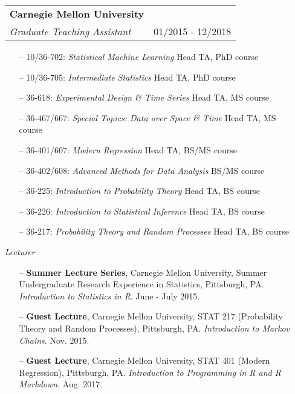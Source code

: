 \documentclass[letterpaper,10pt]{article}
\makeatletter
\newcommand{\subheadingtwo}[4]{
\begin{tabular*}{6.5in}{l@{\cftdotfill{\cftsecdotsep}\extracolsep{\fill}}r}
\textbf{#1} & #2 \\
#3 & {#4} \\
\end{tabular*}}
\makeatother
\begin{document}
\begin{itemize}[leftmargin=0.4cm]

\item[] \subheadingtwo{Carnegie Mellon University}{}{\it Graduate Teaching Assistant}{01/2015 - 12/2018}

\begin{itemize}
\setlength\itemsep{-0.05ex}
\item[--]10/36-702: \hspace{1.5ex}\emph{Statistical Machine Learning} \hfill Head TA, PhD course
\item[--]10/36-705: \hspace{0.5ex} \emph{Intermediate Statistics} \hfill Head TA, PhD course
\item[--]36-618: \hspace{5ex}\emph{Experimental Design \& Time Series} \hfill Head TA, MS course
\item[--]36-467/667:\hspace{0.25ex}  \emph{Special Topics: Data over Space \& Time} \hfill Head TA, MS course
\item[--]36-401/607: \hspace{0.25ex}\emph{Modern Regression} \hfill Head TA, BS/MS course
\item[--]36-402/608: \hspace{0.25ex}\emph{Advanced Methods for Data Analysis} \hfill BS/MS course
\item[--]36-225: \hspace{5ex}\emph{Introduction to Probability Theory} \hfill Head TA, BS course
\item[--]36-226: \hspace{5ex}\emph{Introduction to Statistical Inference} \hfill Head TA, BS course
\item[--]36-217: \hspace{5ex}\emph{Probability Theory and Random Processes} \hfill Head TA, BS course
\vspace{-.1cm}
\end{itemize}

\vspace{0.1cm}

\item[] {\it Lecturer} 

\begin{itemize}
\item[--] {\bf Summer Lecture Series}, Carnegie Mellon University, Summer Undergraduate Research Experience in Statistics, Pittsburgh, PA. {\it Introduction to Statistics in R}. June - July 2015.
\item[--] {\bf Guest Lecture}, Carnegie Mellon University, STAT 217 (Probability Theory and Random Processes), Pittsburgh, PA. {\it Introduction to Markov Chains}. Nov. 2015.
\item[--] {\bf Guest Lecture}, Carnegie Mellon University, STAT 401 (Modern Regression), Pittsburgh, PA. {\it Introduction to Programming in R and R Markdown}. Aug. 2017.
\end{itemize}


\end{itemize}
\end{document}
